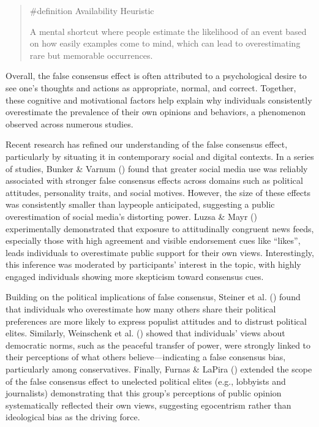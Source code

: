 \documentclass[
  letterpaper,
]{book}
\begin{document}
\begin{quote}
\label{def-availabilityheuristic}{\#definition}
Availability Heuristic

A mental shortcut where people estimate the likelihood of an event based
on how easily examples come to mind, which can lead to overestimating
rare but memorable occurrences.
\end{quote}

Overall, the false consensus effect is often attributed to a
psychological desire to see one's thoughts and actions as appropriate,
normal, and correct. Together, these cognitive and motivational factors
help explain why individuals consistently overestimate the prevalence of
their own opinions and behaviors, a phenomenon observed across numerous
studies.

Recent research has refined our understanding of the false consensus
effect, particularly by situating it in contemporary social and digital
contexts. In a series of studies, Bunker \& Varnum
() found that greater social media
use was reliably associated with stronger false consensus effects across
domains such as political attitudes, personality traits, and social
motives. However, the size of these effects was consistently smaller
than laypeople anticipated, suggesting a public overestimation of social
media's distorting power. Luzsa \& Mayr
() experimentally demonstrated that
exposure to attitudinally congruent news feeds, especially those with
high agreement and visible endorsement cues like ``likes'', leads
individuals to overestimate public support for their own views.
Interestingly, this inference was moderated by participants' interest in
the topic, with highly engaged individuals showing more skepticism
toward consensus cues.

Building on the political implications of false consensus, Steiner et
al. () found that individuals who
overestimate how many others share their political preferences are more
likely to express populist attitudes and to distrust political elites.
Similarly, Weinschenk et al.
() showed that
individuals' views about democratic norms, such as the peaceful transfer
of power, were strongly linked to their perceptions of what others
believe---indicating a false consensus bias, particularly among
conservatives. Finally, Furnas \& LaPira
() extended the scope of the
false consensus effect to unelected political elites (e.g., lobbyists
and journalists) demonstrating that this group's perceptions of public
opinion systematically reflected their own views, suggesting egocentrism
rather than ideological bias as the driving force.
\end{document}
